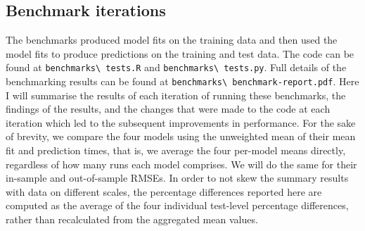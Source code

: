 \documentclass[11pt,twoside,a4paper]{article}
\begin{document}
\subsection{Benchmark iterations}
The benchmarks produced model fits on the training data and then used the model fits to produce predictions on the training and test data. The code can be found at \nolinkurl{benchmarks\ tests.R} and \nolinkurl{benchmarks\ tests.py}\cite{repo}. Full details of the benchmarking results can be found at \nolinkurl{benchmarks\ benchmark-report.pdf}\cite{repo}. Here I will summarise the results of each iteration of running these benchmarks, the findings of the results, and the changes that were made to the code at each iteration which led to the subsequent improvements in performance. For the sake of brevity, we compare the four models using the unweighted mean of their mean fit and prediction times, that is, we average the four per-model means directly, regardless of how many runs each model comprises. We will do the same for their in-sample and out-of-sample RMSEs. In order to not skew the summary results with data on different scales, the percentage differences reported here are computed as the average of the four individual test-level percentage differences, rather than recalculated from the aggregated mean values.
\end{document}
